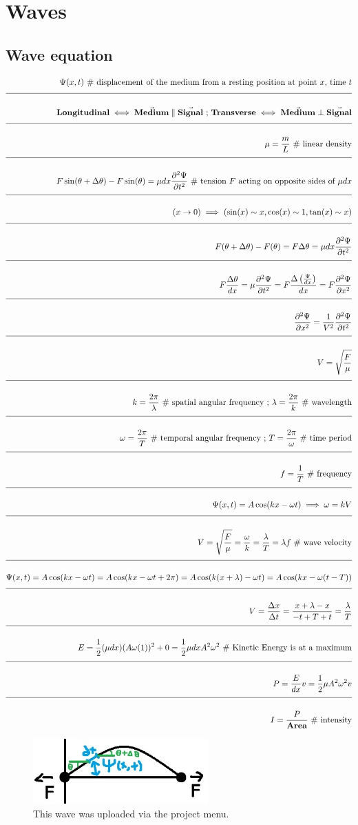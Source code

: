 \documentclass[a4paper]{article}
\newcommand{\eqComment}[1]{\text{  \# #1}}
\newcommand{\eqSep}{\text{ ;  }}
\newcommand{\n}{\\[1.5ex] \hline \nonumber \\[0ex]}
\begin{document}
\section{Waves}
\subsection{Wave equation}
\begin{tcolorbox}
\begin{align}
   \Psi(x,t) \eqComment{displacement of the medium from a resting position at point $x$, time $t$}
\n \textbf{Longitudinal} \iff \vec{\textbf{Medium}} \parallel \vec{\textbf{Signal}} \eqSep \textbf{Transverse} \iff \vec{\textbf{Medium}} \perp \vec{\textbf{Signal}}
\n \mu = \frac{m}{L} \eqComment{linear density}
\n F \sin(\theta + \Delta \theta) - F \sin(\theta) = \mu dx \frac{\partial ^2 \Psi}{\partial t^2} \eqComment{tension $F$ acting on opposite sides of $\mu dx$}
\n (x \to 0) \implies (\sin(x) \sim x, \cos(x) \sim 1, \tan(x) \sim x) 
\n F (\theta + \Delta \theta) - F (\theta) = F \Delta \theta = \mu dx \frac{\partial ^2 \Psi}{\partial t^2}
\n F \frac{\Delta \theta}{dx} = \mu \frac{\partial ^2 \Psi}{\partial t^2} = F \frac{\Delta \left(\frac{\Psi}{dx}\right)}{dx} = F \frac{\partial ^2 \Psi}{\partial x^2}
\n \frac{\partial ^2 \Psi}{\partial x^2} = \frac{1}{V^2} \frac{\partial ^2 \Psi}{\partial t^2}
\n V = \sqrt{\frac{F}{\mu}}
\n k = \frac{2 \pi}{\lambda} \eqComment{spatial angular frequency} \eqSep \lambda = \frac{2 \pi}{k} \eqComment{wavelength}
\n \omega = \frac{2 \pi}{T} \eqComment{temporal angular frequency} \eqSep T = \frac{2 \pi}{\omega} \eqComment{time period}
\n f = \frac{1}{T} \eqComment{frequency}
\n \Psi(x, t) = A \cos(k x - \omega t) \implies \omega = k V 
\n V = \sqrt{\frac{F}{\mu}} = \frac{\omega}{k} = \frac{\lambda}{T} = \lambda f \eqComment{wave velocity}
\n \Psi(x, t) = A \cos(k x - \omega t) = A \cos(k x - \omega t + 2 \pi) = A \cos(k (x + \lambda) - \omega t) = A \cos(k x - \omega (t - T))
\n V = \frac{\Delta x}{\Delta t} = \frac{x + \lambda - x}{-t + T + t} = \frac{\lambda}{T}
\n E = \frac{1}{2} (\mu dx) (A \omega (1))^2 + 0 = \frac{1}{2} \mu dx A^2 \omega^2 \eqComment{Kinetic Energy is at a maximum}
\n P = \frac{E}{dx} v = \frac{1}{2} \mu A^2 \omega^2 v
\n I = \frac{P}{\textbf{Area}} \eqComment{intensity}
\end{align}
\end{tcolorbox}

\begin{figure}[h]
\centering
\includegraphics[width=0.6\textwidth]{figures/wave.jpg}
\caption{\label{fig:wave}This wave was uploaded via the project menu.}
\end{figure} \FloatBarrier
\end{document}
